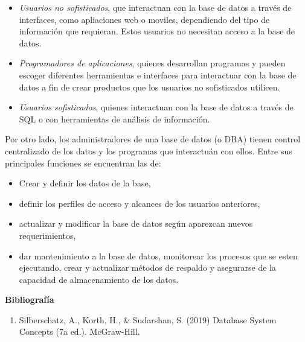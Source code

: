 \documentclass[a4paper,12pt]{report}
\begin{document}
\begin{itemize}

	\item\emph{Usuarios no sofisticados}, que interactuan con la base de datos a través de interfaces, como apliaciones web o moviles, dependiendo del tipo de información que requieran. Estos usuarios no necesitan acceso a la base de datos. 
	
	\item\emph{Programadores de aplicaciones}, quienes desarrollan programas y pueden escoger diferentes herramientas e interfaces para interactuar con la base de datos a fin de crear productos que los usuarios no sofisticados utilicen.
	
	\item\emph{Usuarios sofisticados}, quienes interactuan con la base de datos a través de SQL o con herramientas de análisis de información.

\end{itemize}

Por otro lado, los administradores de una base de datos (o DBA) tienen control centralizado de los datos y los programas que interactuán con ellos. Entre sus principales funciones se encuentran las de:\\

\begin{itemize}

	\item Crear y definir los datos de la base,
	\item definir los perfiles de acceso y alcances de los usuarios anteriores,
	\item actualizar y modificar la base de datos según aparezcan nuevos requerimientos, 
	\item dar mantenimiento a la base de datos, monitorear los procesos que se esten ejecutando, crear y actualizar métodos de respaldo y asegurarse de la capacidad de almacenamiento de los datos.

\end{itemize}

\newpage

\textbf{Bibliografía}

\begin{enumerate}
	\item Silberschatz, A., Korth, H., \& Sudarshan, S. (2019) Database System Concepts (7a ed.). McGraw-Hill.
\end{enumerate}
\end{document}
